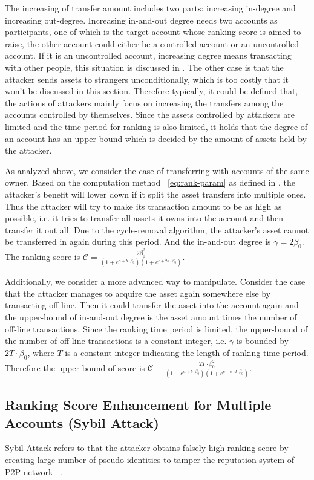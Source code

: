 The increasing of transfer amount includes two parts: increasing in-degree and increasing out-degree. Increasing in-and-out degree needs two accounts as participants, one of which is the target account whose ranking score is aimed to raise, the other account could either be a controlled account or an  uncontrolled account. If it is an uncontrolled account, increasing degree means transacting with other people, this situation is discussed in . The other case is that the attacker sends assets to strangers unconditionally, which is too costly that it won't be discussed in this section. Therefore typically, it could be defined that, the actions of attackers mainly focus on increasing the transfers among the accounts controlled by themselves. Since the assets controlled by attackers are limited and the time period for ranking is also limited, it holds that the degree of an account has an upper-bound which is decided by the amount of assets held by the attacker.

As analyzed above, we consider the case of transferring with accounts of the same owner. Based on the computation method ~\ref{eq:rank-param} as defined in , the attacker's benefit will lower down if it split the asset transfers into multiple ones. Thus the attacker will try to make its transaction amount to be as high as possible, i.e. it tries to transfer all assets it owns into the account and then transfer it out all. Due to the cycle-removal algorithm, the attacker's asset cannot be transferred in again during this period. And the in-and-out degree is $\gamma = 2 \beta_0$. The ranking score is $\mathcal{C} =  \frac{2 \beta_0 ^2}{ (1+e^{a + b \cdot \beta_0}) (1+e^{c + 2 d \cdot \beta_0})}$.

Additionally, we consider a more advanced way to manipulate. Consider the case that the attacker manages to acquire the asset again somewhere else by transacting off-line. Then it could transfer the asset into the account again and the upper-bound of in-and-out degree is the asset amount times the number of off-line transactions. Since the ranking time period is limited, the upper-bound of the number of off-line transactions is a constant integer, i.e. $\gamma$ is bounded by $2T \cdot \beta_0$, where $T$ is a constant integer indicating the length of ranking time period. Therefore the upper-bound of score is $\mathcal{C} =  \frac{2T \cdot \beta_0 ^2}{ (1+e^{a + b \cdot \beta_0}) (1+e^{c + c \cdot d \cdot \beta_0})}$.

\subsection{Ranking Score Enhancement for Multiple Accounts (Sybil Attack)}
Sybil Attack refers to that the attacker obtains falsely high ranking score by creating large number of pseudo-identities to tamper the reputation system of P2P network ~\cite{quercia2010sybil}.

